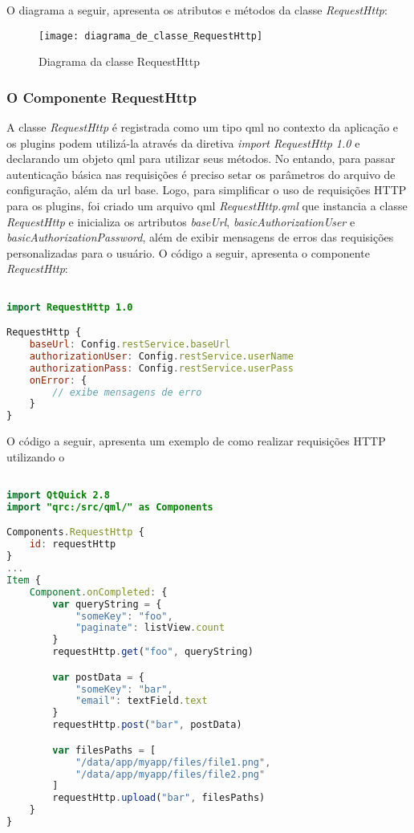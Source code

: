 O diagrama a seguir, apresenta os atributos e métodos da classe \textit{RequestHttp}:

\begin{figure}[h]
	\texttt{[image: diagrama\_de\_classe\_RequestHttp]}
	\centering
	\caption{Diagrama da classe RequestHttp}
\end{figure}


\subsubsection{O Componente RequestHttp}\label{sec:solucao-desenvolvida}
A classe \textit{RequestHttp} é registrada como um tipo qml no contexto da aplicação e os plugins podem utilizá-la através da diretiva \textit{import RequestHttp 1.0} e declarando um objeto qml para utilizar seus métodos. No entando, para passar autenticação básica nas requisições é preciso setar os parâmetros do arquivo de configuração, além da url base. Logo, para simplificar o uso de requisições HTTP para os plugins, foi criado um arquivo qml \textit{RequestHttp.qml} que instancia a classe \textit{RequestHttp} e inicializa os artributos \textit{baseUrl}, \textit{basicAuthorizationUser} e \textit{basicAuthorizationPassword}, além de exibir mensagens de erros das requisições personalizadas para o usuário. O código a seguir, apresenta o componente \textit{RequestHttp}:

\begin{center}
\begin{lstlisting}[language=qml]

import RequestHttp 1.0 

RequestHttp {
    baseUrl: Config.restService.baseUrl
    authorizationUser: Config.restService.userName
    authorizationPass: Config.restService.userPass
    onError: {
		// exibe mensagens de erro
    }
}
\end{lstlisting}
\end{center}

O código a seguir, apresenta um exemplo de como realizar requisições HTTP utilizando o 

\begin{center}
\begin{lstlisting}[language=qml]

import QtQuick 2.8
import "qrc:/src/qml/" as Components

Components.RequestHttp {
	id: requestHttp
}
...
Item {
	Component.onCompleted: {
		var queryString = {
			"someKey": "foo",
			"paginate": listView.count
		}
		requestHttp.get("foo", queryString)

		var postData = {
			"someKey": "bar",
			"email": textField.text
		}
		requestHttp.post("bar", postData)

		var filesPaths = [
			"/data/app/myapp/files/file1.png",
			"/data/app/myapp/files/file2.png"
		]
		requestHttp.upload("bar", filesPaths)
    }
}
\end{lstlisting}
\end{center}

